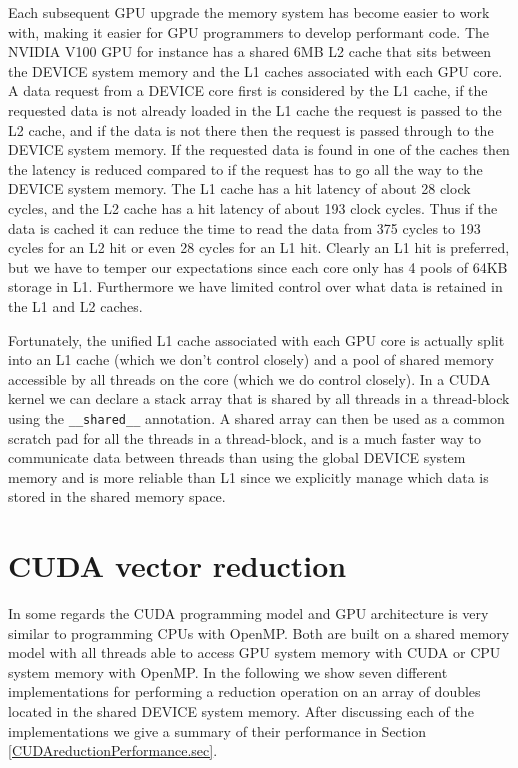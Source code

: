 Each subsequent GPU upgrade the memory system has become easier to work with, making it easier for GPU programmers to develop performant code. The NVIDIA V100 GPU for instance has a shared 6MB L2 cache that sits between the DEVICE system memory and the L1 caches associated with each GPU core. A data request from a DEVICE core first is considered by the L1 cache, if the requested data is not already loaded in the L1 cache the request is passed to the L2 cache, and if the data is not there then the request is passed through to the DEVICE system memory. If the requested data is found in one of the caches then the latency is reduced compared to if the request has to go all the way to the DEVICE system memory. The L1 cache has a hit latency of about 28 clock cycles, and the L2 cache has a hit latency of about 193 clock cycles. Thus if the data is cached it can reduce the time to read the data from 375 cycles to 193 cycles for an L2 hit or even 28 cycles for an L1 hit. Clearly an L1 hit is preferred, but we have to temper our expectations since each core only has 4 pools of 64KB storage in L1. Furthermore we have limited control over what data is retained in the L1 and L2 caches. 

Fortunately, the unified L1 cache associated with each GPU core is actually split into an L1 cache (which we don't control closely) and a pool of shared memory accessible by all threads on the core (which we do control closely). In a CUDA kernel we can declare a stack array that is shared by all threads in a thread-block using the \texttt{\_\_shared\_\_} annotation. A shared array can then be used as a common scratch pad for all the threads in a thread-block, and is a much faster way to communicate data between threads than using the global DEVICE system memory and is more reliable than L1 since we explicitly manage which data is stored in the shared memory space.


\section{CUDA vector reduction}

In some regards the CUDA programming model and GPU architecture is very similar to programming CPUs with OpenMP. Both are built on a shared memory model with all threads able to access GPU system memory with CUDA or CPU system memory with OpenMP. In the following we show seven different implementations for performing a reduction operation on an array of doubles located in the shared DEVICE system memory. After discussing each of the implementations we give a summary of their performance in Section \ref{CUDAreductionPerformance.sec}.


